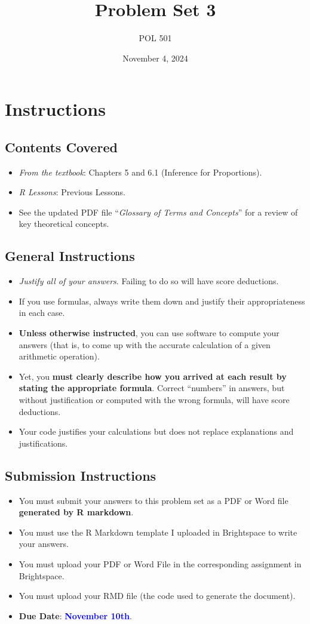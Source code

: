 \documentclass[11pt]{article}
\title{Problem Set 3}
\author{POL 501}
\date{November 4, 2024}
\begin{document}
\maketitle

\section*{Instructions}
\subsection*{Contents Covered}
\begin{itemize}
    \item \emph{From the textbook}: Chapters 5 and 6.1 (Inference for Proportions).
    \item \emph{R Lessons}: Previous Lessons.
    \item See the updated PDF file ``\emph{Glossary of Terms and Concepts}'' for a review of key theoretical concepts.
\end{itemize}
\subsection*{General Instructions}
\begin{itemize}
    \item \emph{Justify all of your answers}. Failing to do so will have score deductions.
    \item If you use formulas, always write them down and justify their appropriateness in each case.
    \item \textbf{Unless otherwise instructed}, you can use software to compute your answers (that is, to come up with the accurate calculation of a given arithmetic operation).
    \item Yet, you \textbf{must clearly describe how you arrived at each result by stating the appropriate formula}. Correct ``numbers'' in answers, but without justification or computed with the wrong formula, will have score deductions.
    \item Your code justifies your calculations but does not replace explanations and justifications.
\end{itemize}
\subsection*{Submission Instructions}
\begin{itemize}
    \item You must submit your answers to this problem set as a PDF or Word file \textbf{generated by R markdown}.
    \item You must use the R Markdown template I uploaded in Brightspace to write your answers.
    \item You must upload your PDF or Word File in the corresponding assignment in Brightspace.
    \item You must upload your RMD file (the code used to generate the document).
    \item \textbf{Due Date}: \textcolor{blue}{\textbf{November 10th}}.
\end{itemize}
\end{document}
